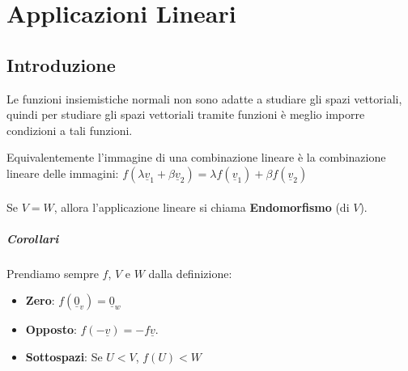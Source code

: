 \chapter{Applicazioni Lineari}

\section{Introduzione}
Le funzioni insiemistiche normali non sono adatte a studiare gli spazi vettoriali,
quindi per studiare gli spazi vettoriali tramite funzioni è meglio imporre condizioni a tali funzioni.

Equivalentemente l'immagine di una combinazione lineare è la combinazione lineare delle immagini:
$f(\lambda\underline{v}_1 + \beta\underline{v}_2) = \lambda f(\underline{v}_1) + \beta f(\underline{v}_2)$
\\
\\Se $V=W$, allora l'applicazione lineare si chiama \textbf{Endomorfismo} (di $V$).
\paragraph{Corollari}
Prendiamo sempre $f$, $V$ e $W$ dalla definizione:
\begin{itemize}
	\item \textbf{Zero}: $f(\underline{0}_v) = \underline{0}_w$
	\item \textbf{Opposto}: $f(-\underline{v}) = -f\underline{v}$.
	\item \textbf{Sottospazi}: Se $U<V$, $f(U) < W$
\end{itemize}


